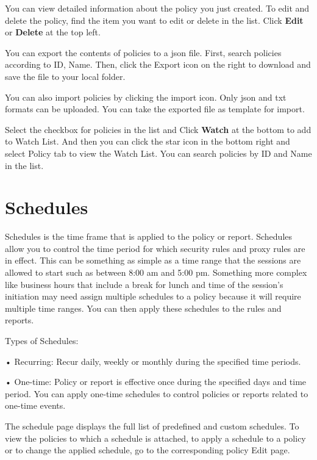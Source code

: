 You can view detailed information about the policy you just created. To edit and delete the policy, find the item you want to edit or delete in the list. Click \textbf{Edit} or \textbf{Delete} at the top left.


You can export the contents of policies to a json file. First, search policies according to ID, Name. Then, click the Export icon on the right to download and save the file to your local folder.


You can also import policies by clicking the import icon. Only json and txt formats can be uploaded. You can take the exported file as template for import.


Select the checkbox for policies in the list and Click \textbf{Watch} at the bottom to add to Watch List. And then you can click the star icon in the bottom right and select Policy tab to view the Watch List. You can search policies by ID and Name in the list.

\section*{\hypertarget{link:Schedules}{Schedules}}
\label{sec:policies:schedules}

Schedules is the time frame that is applied to the policy or report. Schedules allow you to control the time period for which security rules and proxy rules are in effect. This can be something as simple as a time range that the sessions are allowed to start such as between 8:00 am and 5:00 pm. Something more complex like business hours that include a break for lunch and time of the session’s initiation may need assign multiple schedules to a policy because it will require multiple time ranges. You can then apply these schedules to the rules and reports.


Types of Schedules:


• Recurring: Recur daily, weekly or monthly during the specified time periods. 


• One-time: Policy or report is effective once during the specified days and time period. You can apply one-time schedules to control policies or reports related to one-time events. 


The schedule page displays the full list of predefined and custom schedules. To view the policies to which a schedule is attached, to apply a schedule to a policy or to change the applied schedule, go to the corresponding policy Edit page. 


